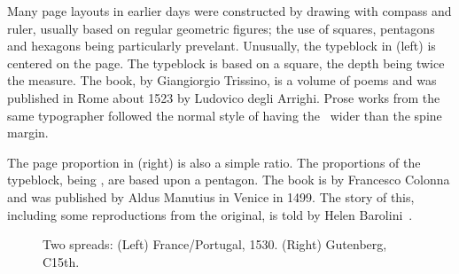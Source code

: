 \documentclass[10pt,a4paper,oneside,extrafontsizes]{memoir}%
\begin{document}
\begin{paracol}{2}
\switchEng
 Many page layouts in earlier days were constructed by
drawing with compass and ruler, usually based on regular geometric figures; 
the use of squares, pentagons and hexagons being particularly
prevelant. Unusually, the typeblock in  (left) 
is centered on the page. The typeblock is based on a 
square, the depth being twice the measure. The book,  by 
Giangiorgio Trissino, is a volume of poems and was published in Rome 
about 1523 by Ludovico degli Arrighi. 
Prose works
from the same typographer followed the normal style of having the \foredge\
wider than the spine margin.

    The page proportion in  (right) is also a simple 
ratio. The proportions of the typeblock, being \ratio{1.7}{1}, 
are based upon a pentagon.
The book is  by Francesco Colonna and was
published by Aldus Manutius\index{Manutius, Aldus} in Venice in 1499. 
The story of this,
including some reproductions from the original, is told by Helen
Barolini~\autocite{BAROLINI92}.
\end{paracol}

\begin{figure}
\centering
\begin{minipage}[b]{\pwlayi}
\end{minipage}
\hfill
\begin{minipage}[b]{\pwlayi}
\end{minipage}
\caption[Two spreads: France/Portugal, 1530 and Gutenberg, C15th]%
        {Two spreads: (Left) France/Portugal, 1530.
         (Right) Gutenberg, C15th.} \label{fb:9}
\end{figure}
\end{document}
